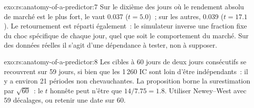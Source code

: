 \begin{solution}{exo:rs:anatomy-of-a-predictor:7}
Sur le dixième des jours où le rendement absolu de marché est le plus fort, le  vaut 0.037 ($t = 5.0$)~; sur les autres, 0.039 ($t = 17.1$). Le
retournement est réparti également~: le simulateur inverse une fraction fixe du choc spécifique de chaque jour, quel que soit le comportement du marché. Sur des données réelles
il s'agit d'une dépendance à tester, non à supposer.
\end{solution}

\begin{solution}{exo:rs:anatomy-of-a-predictor:8}
Les cibles à 60 jours de deux jours consécutifs se recouvrent sur 59 jours, si bien que les 1\,260 IC sont loin d'être indépendants~: il y a environ 21
périodes non chevauchantes. La proposition borne la surestimation par $\sqrt{60}$~: le $t$ honnête peut n'être que $14/7.75 = 1.8$. Utiliser
Newey--West avec 59 décalages, ou retenir une date sur 60.
\end{solution}

